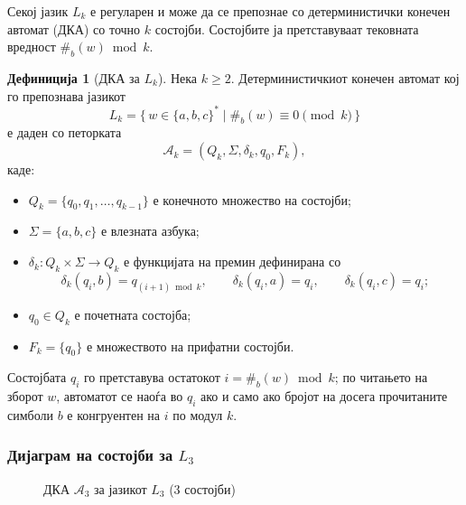 \documentclass[12pt,a4paper]{article}
\theoremstyle{definition}
\newtheorem{definition}{Дефиниција}
\begin{document}
Секој јазик $L_k$ е регуларен и може да се препознае со детерминистички конечен автомат (ДКА) со точно $k$ состојби. Состојбите ја претставуваат тековната вредност $\#_b(w) \bmod k$.

\begin{definition}[ДКА за $L_k$]
Нека $k \geq 2$. Детерминистичкиот конечен автомат кој го препознава
јазикот
\[
L_k=\{\,w\in\{a,b,c\}^* \mid \#_b(w)\equiv 0 \pmod{k}\,\}
\]
е даден со петорката
\[
\mathcal{A}_k=(Q_k,\Sigma,\delta_k,q_0,F_k),
\]
каде:

\begin{itemize}
    \item $Q_k=\{q_0,q_1,\ldots,q_{k-1}\}$ е конечното множество на состојби;
    \item $\Sigma=\{a,b,c\}$ е влезната азбука;
    \item $\delta_k:Q_k\times\Sigma\to Q_k$ е функцијата на премин дефинирана со
    \[
    \delta_k(q_i,b)=q_{(i+1)\bmod k},
    \qquad
    \delta_k(q_i,a)=q_i,
    \qquad
    \delta_k(q_i,c)=q_i;
    \]
    \item $q_0\in Q_k$ е почетната состојба;
    \item $F_k=\{q_0\}$ е множеството на прифатни состојби.
\end{itemize}

Состојбата $q_i$ го претставува остатокот $i=\#_b(w)\bmod k$; по читањето на зборот $w$, автоматот се наоѓа во $q_i$ ако и само ако бројот на досега прочитаните симболи $b$ е конгруентен на $i$ по модул $k$.
\end{definition}


\subsubsection{Дијаграм на состојби за $L_3$}

\begin{figure}[H]
\centering
{}
\caption{ДКА $\mathcal{A}_3$ за јазикот $L_3$ (3 состојби)}
\end{figure}
\end{document}
